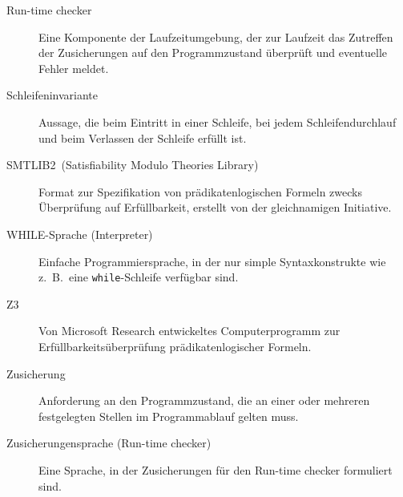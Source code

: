 \begin{description}
    \item[Run-time checker] Eine Komponente der Laufzeitumgebung, der zur Laufzeit das Zutreffen der Zusicherungen auf den Programmzustand überprüft und eventuelle Fehler meldet.
    \item[Schleifeninvariante] Aussage, die beim Eintritt in einer Schleife, bei jedem Schleifendurchlauf und beim Verlassen der Schleife erfüllt ist.
    \item[SMTLIB2~(Satisfiability Modulo Theories Library)] Format zur Spezifikation von prädikatenlogischen Formeln zwecks Überprüfung auf Erfüllbarkeit, erstellt von der gleichnamigen Initiative.
    \item[WHILE-Sprache (Interpreter)] Einfache Programmiersprache, in der nur simple Syntaxkonstrukte wie z.~B.\ eine \texttt{while}-Schleife verfügbar sind.
    \item[Z3] Von Microsoft Research entwickeltes Computerprogramm zur Erfüllbarkeitsüberprüfung prädikatenlogischer Formeln.
    \item[Zusicherung] Anforderung an den Programmzustand, die an einer oder mehreren festgelegten Stellen im Programmablauf gelten muss.
    \item[Zusicherungensprache (Run-time checker)] Eine Sprache, in der \see Zusicherungen für den \see Run-time checker formuliert sind.
   
\end{description}

